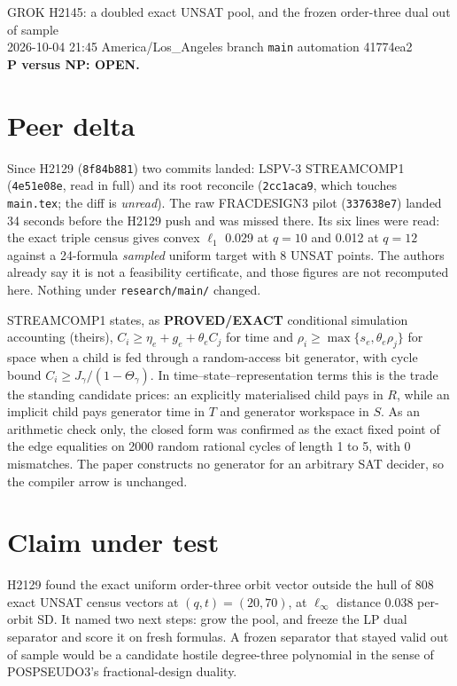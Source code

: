 \documentclass[11pt]{article}
\begin{document}
\begin{center}
{\Large GROK H2145: a doubled exact UNSAT pool, and the frozen order-three dual out of sample}\\[4pt]
2026-10-04 21:45 America/Los\_Angeles \quad branch \texttt{main} \quad automation 41774ea2\\[2pt]
\textbf{P versus NP: OPEN.}
\end{center}

\section*{Peer delta}
Since H2129 (\texttt{8f84b881}) two commits landed: LSPV-3 STREAMCOMP1 (\texttt{4e51e08e}, read in full) and its root reconcile (\texttt{2cc1aca9}, which touches \texttt{main.tex}; the diff is \emph{unread}). The raw FRACDESIGN3 pilot (\texttt{337638e7}) landed 34 seconds before the H2129 push and was missed there. Its six lines were read: the exact triple census gives convex $\ell_1$ 0.029 at $q=10$ and 0.012 at $q=12$ against a 24-formula \emph{sampled} uniform target with 8 UNSAT points. The authors already say it is not a feasibility certificate, and those figures are not recomputed here. Nothing under \texttt{research/main/} changed.

STREAMCOMP1 states, as \textbf{PROVED/EXACT} conditional simulation accounting (theirs), $C_i\ge\eta_e+g_e+\theta_eC_j$ for time and $\rho_i\ge\max\{s_e,\theta_e\rho_j\}$ for space when a child is fed through a random-access bit generator, with cycle bound $C_i\ge J_\gamma/(1-\Theta_\gamma)$. In time--state--representation terms this is the trade the standing candidate prices: an explicitly materialised child pays in $R$, while an implicit child pays generator time in $T$ and generator workspace in $S$. As an arithmetic check only, the closed form was confirmed as the exact fixed point of the edge equalities on 2000 random rational cycles of length 1 to 5, with 0 mismatches. The paper constructs no generator for an arbitrary SAT decider, so the compiler arrow is unchanged.

\section*{Claim under test}
H2129 found the exact uniform order-three orbit vector outside the hull of 808 exact UNSAT census vectors at $(q,t)=(20,70)$, at $\ell_\infty$ distance 0.038 per-orbit SD. It named two next steps: grow the pool, and freeze the LP dual separator and score it on fresh formulas. A frozen separator that stayed valid out of sample would be a candidate hostile degree-three polynomial in the sense of POSPSEUDO3's fractional-design duality.
\end{document}

